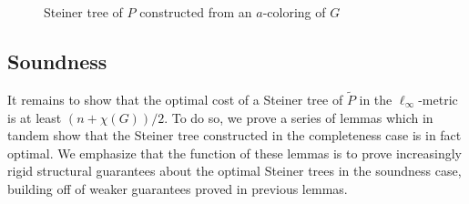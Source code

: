 \documentclass{article}\providecommand{\DeclareRedundantLanguages}[2]{}\usepackage[a4paper,margin=20mm]{geometry}
\newcommand{\1}{\textbf{1}}
\renewcommand{\tilde}{\widetilde}
\begin{document}
\begin{figure}[!ht]






\caption{Steiner tree of $P$ constructed from an $a$-coloring of $G$}
\label{fig: completeness construction}
\end{figure}

\subsection{Soundness}
It remains to show that the optimal cost of a Steiner tree of $\tilde{P}$ in the $\ell_{\infty}$-metric is at least $(n + \chi(G))/2$. To do so, we prove a series of lemmas which in tandem show that the Steiner tree constructed in the completeness case is in fact optimal. We emphasize that the function of these lemmas is to prove increasingly rigid structural guarantees about the optimal Steiner trees in the soundness case, building off of weaker guarantees proved in previous lemmas.
\end{document}
